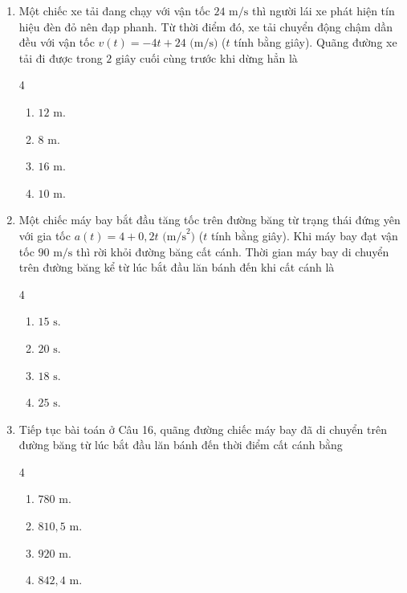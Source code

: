 \documentclass[12pt]{article}
\begin{document}
\begin{enumerate}[label=\textbf{Câu \arabic*.}]
		\item Một chiếc xe tải đang chạy với vận tốc $24\text{ m/s}$ thì người lái xe phát hiện tín hiệu đèn đỏ nên đạp phanh. Từ thời điểm đó, xe tải chuyển động chậm dần đều với vận tốc $v(t) = -4t + 24\text{ (m/s)}$ ($t$ tính bằng giây). Quãng đường xe tải đi được trong $2\text{ giây}$ cuối cùng trước khi dừng hẳn là
		\begin{multicols}{4}
			\begin{enumerate}[label=\textbf{\Alph*.}]
				\item $12\text{ m}$.
				\item $8\text{ m}$.
				\item $16\text{ m}$.
				\item $10\text{ m}$.
			\end{enumerate}
		\end{multicols}
		
		\item Một chiếc máy bay bắt đầu tăng tốc trên đường băng từ trạng thái đứng yên với gia tốc $a(t) = 4 + 0{,}2t\text{ (m/s}^2\text{)}$ ($t$ tính bằng giây). Khi máy bay đạt vận tốc $90\text{ m/s}$ thì rời khỏi đường băng cất cánh. Thời gian máy bay di chuyển trên đường băng kể từ lúc bắt đầu lăn bánh đến khi cất cánh là
		\begin{multicols}{4}
			\begin{enumerate}[label=\textbf{\Alph*.}]
				\item $15\text{ s}$.
				\item $20\text{ s}$.
				\item $18\text{ s}$.
				\item $25\text{ s}$.
			\end{enumerate}
		\end{multicols}
		
		\item Tiếp tục bài toán ở Câu 16, quãng đường chiếc máy bay đã di chuyển trên đường băng từ lúc bắt đầu lăn bánh đến thời điểm cất cánh bằng
		\begin{multicols}{4}
			\begin{enumerate}[label=\textbf{\Alph*.}]
				\item $780\text{ m}$.
				\item $810{,}5\text{ m}$.
				\item $920\text{ m}$.
				\item $842{,}4\text{ m}$.
			\end{enumerate}
		\end{multicols}
		

\end{enumerate}
\end{document}
